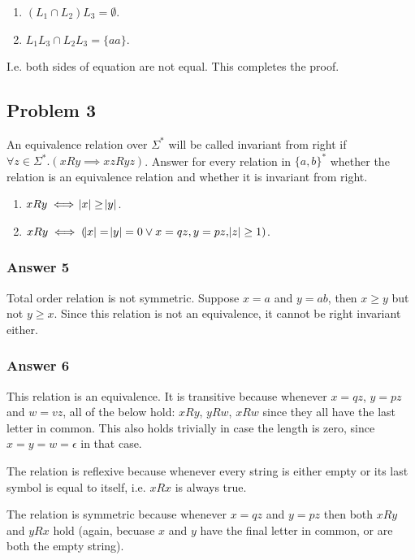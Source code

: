 \documentclass[11pt]{article}
\begin{document}
\begin{enumerate}
\item \((L_1 \cap L_2) L_3 = \emptyset\).
\item \(L_1 L_3 \cap L_2 L_3 = \{aa\}\).
\end{enumerate}

I.e. both sides of equation are not equal.  This completes the proof.

\subsection{Problem 3}
\label{sec:orgheadline9}
An equivalence relation over \(\Sigma^*\) will be called invariant from
right if \(\forall z \in \Sigma^*.(xRy \implies xzRyz)\).  Answer for
every relation in \(\{a, b\}^*\) whether the relation is an equivalence
relation and whether it is invariant from right.

\begin{enumerate}
\item \(xRy \iff \abs{x} \geq \abs{y}\).
\item \(xRy \iff (\abs{x} = \abs{y} = 0 \lor x = qz, y = pz, \abs{z} \geq 1)\).
\end{enumerate}

\subsubsection{Answer 5}
\label{sec:orgheadline7}
Total order relation is not symmetric.  Suppose \(x = a\) and \(y = ab\), then
\(x \geq y\) but not \(y \geq x\).  Since this relation is not an equivalence,
it cannot be right invariant either.

\subsubsection{Answer 6}
\label{sec:orgheadline8}
This relation is an equivalence.  It is transitive because whenever
\(x = qz\), \(y = pz\) and \(w = vz\), all of the below hold: \(xRy\), \(yRw\),
\(xRw\) since they all have the last letter in common.  This also holds
trivially in case the length is zero, since \(x = y = w = \epsilon\) in
that case.

The relation is reflexive because whenever every string is either
empty or its last symbol is equal to itself, i.e. \(xRx\) is always true.

The relation is symmetric because whenever \(x = qz\) and \(y = pz\) then
both \(xRy\) and \(yRx\) hold (again, becuase \(x\) and \(y\) have the final
letter in common, or are both the empty string).
\end{document}

